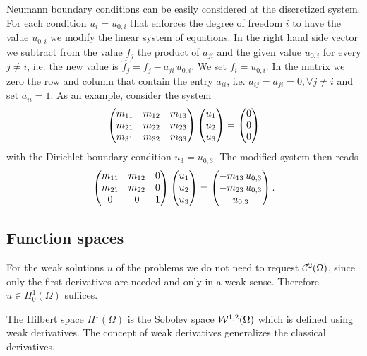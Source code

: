 Neumann boundary conditions can be easily considered at the discretized system. For each condition $u_i = u_{0,i}$ that enforces the degree of freedom $i$ to have the value $u_{0,i}$ we modify the linear system of equations. In the  right hand side vector we subtract from the value $f_{j}$ the product of $a_{ji}$ and the given value $u_{0,i}$ for every $j\neq i$, i.e. the new value is $\hat{f_j} = f_j - a_{ji}\,u_{0,i}$. We set $f_i = u_{0,i}$. In the matrix we zero the row and column that contain the entry $a_{ii}$, i.e. $a_{ij} = a_{ji} = 0, ∀j\neq i$ and set $a_{ii}=1$. As an example, consider the system
%
\begin{equation*}
  \begin{array}{lll}
    \left(\begin{matrix}m_{11} & m_{12} & m_{13} \\ m_{21} & m_{22} & m_{23} \\ m_{31} & m_{32} & m_{33}\end{matrix}\right)
    \left(\begin{matrix}u_1 \\ u_2 \\ u_3\end{matrix}\right) = \left(\begin{matrix}0 \\ 0 \\ 0\end{matrix}\right)
  \end{array}
\end{equation*}
with the Dirichlet boundary condition $u_3 = u_{0,3}$. The modified system then reads
%
\begin{equation*}
  \begin{array}{lll}
    \left(\begin{matrix}m_{11} & m_{12} & 0 \\ m_{21} & m_{22} & 0 \\ 0 & 0 & 1\end{matrix}\right)
    \left(\begin{matrix}u_1 \\ u_2 \\ u_3\end{matrix}\right) = \left(\begin{matrix}-m_{13}\,u_{0,3} \\ -m_{23}\,u_{0,3} \\ u_{0,3}\end{matrix}\right).
  \end{array}
\end{equation*}

\subsection{Function spaces}
\label{sec:hilbert}
%
For the weak solutions $u$ of the problems we do not need to request $\mathcal{C}^2(\Omega)$, since only the first derivatives are needed and only in a weak sense. Therefore $u\in H^1_0(\Omega)$ suffices.

The Hilbert space $H^1(\Omega)$ is the Sobolev space $\mathcal{W}^{1,2}(\Omega)$ which is defined using weak derivatives. The concept of weak derivatives generalizes the classical derivatives.

